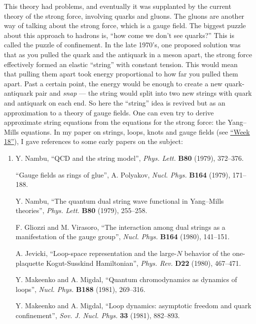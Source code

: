 \documentclass[12pt]{article}
\begin{document}
This theory had problems, and eventually it was supplanted by the
current theory of the strong force, involving quarks and gluons. The
gluons are another way of talking about the strong force, which is a
gauge field. The biggest puzzle about this approach to hadrons is, ``how
come we don't see quarks?'' This is called the puzzle of confinement. In
the late 1970's, one proposed solution was that as you pulled the quark
and the antiquark in a meson apart, the strong force effectively formed
an elastic ``string'' with constant tension. This would mean that
pulling them apart took energy proportional to how far you pulled them
apart. Past a certain point, the energy would be enough to create a new
quark-antiquark pair and \emph{snap} --- the string would split into two
new strings with quark and antiquark on each end. So here the ``string''
idea is revived but as an approximation to a theory of gauge fields. One
can even try to derive approximate string equations from the equations
for the strong force: the Yang--Mills equations. In my paper on strings,
loops, knots and gauge fields (see \protect\hyperlink{week18}{``Week
18''}), I gave references to some early papers on the subject:

\begin{enumerate}
\def\labelenumi{\arabic{enumi})}
\item
  Y. Nambu, ``QCD and the string model'', \emph{Phys. Lett.}
  \textbf{B80} (1979), 372--376.

  ``Gauge fields as rings of glue'', A. Polyakov, \emph{Nucl. Phys.}
  \textbf{B164} (1979), 171--188.

  Y. Nambu, ``The quantum dual string wave functional in Yang--Mills theories'', 
  \emph{Phys. Lett.} \textbf{B80} (1979),
  255--258.

  F. Gliozzi and M. Virasoro, ``The interaction among dual strings as a manifestation of the gauge
  group'', \emph{Nucl. Phys.}
  \textbf{B164} (1980), 141--151.

  A. Jevicki, ``Loop-space representation and the large-\(N\) behavior of the
  one-plaquette Kogut-Susskind Hamiltonian'', \emph{Phys.
  Rev.} \textbf{D22} (1980), 467--471.

 Y. Makeenko and A. Migdal,  ``Quantum chromodynamics as dynamics of loops'', 
  \emph{Nucl. Phys.} \textbf{B188} (1981), 269--316.

  Y.  Makeenko and A. Migdal, ``Loop dynamics: asymptotic freedom and quark confinement'', \emph{Sov. J. Nucl. Phys.} \textbf{33} (1981), 882--893.
\end{enumerate}
\end{document}
